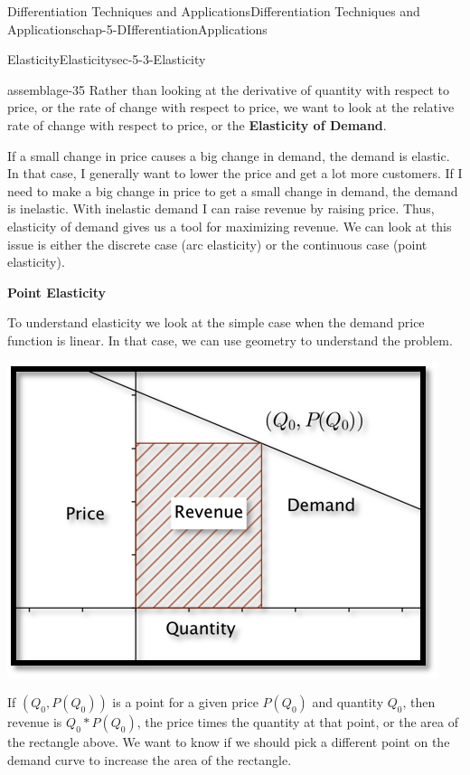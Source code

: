\documentclass[oneside,10pt,]{book}
\newcommand{\terminology}[1]{\textbf{#1}}
\numberwithin{equation}{section}
\begin{document}
\begin{chapterptx}{Differentiation Techniques and Applications}{}{Differentiation Techniques and Applications}{}{}{chap-5-DIfferentiationApplications}
\begin{sectionptx}{Elasticity}{}{Elasticity}{}{}{sec-5-3-Elasticity}
\begin{assemblage}{}{assemblage-35}%
\hypertarget{p-2021}{}%
Rather than looking at the derivative of quantity with respect to price, or the rate of change with respect to price, we want to look at the relative rate of change with respect to price, or the \terminology{Elasticity of Demand}.%
\end{assemblage}
\hypertarget{p-2022}{}%
If a small change in price causes a big change in demand, the demand is elastic.  In that case, I generally want to lower the price and get a lot more customers.  If I need to make a big change in price to get a small change in demand, the demand is inelastic.  With inelastic demand I can raise revenue by raising price.  Thus, elasticity of demand gives us a tool for maximizing revenue.  We can look at this issue is either the discrete case (arc elasticity) or the continuous case (point elasticity).%
\par
\hypertarget{p-2023}{}%
\terminology{Point Elasticity}%
\par
\hypertarget{p-2024}{}%
To understand elasticity we look at the simple case when the demand price function is linear.  In that case, we can use geometry to understand the problem.%
\begin{sidebyside}{1}{0.2}{0.2}{0}%
\begin{sbspanel}{0.6}%
\includegraphics[width=1\linewidth]{images/sec5-3-1.png}
\end{sbspanel}%
\end{sidebyside}%
\par
\hypertarget{p-2025}{}%
If \((Q_0,P(Q_0 ))\) is a point for a given price \(P(Q_0)\) and quantity \(Q_0\), then revenue is \(Q_0*P(Q_0)\), the price times the quantity at that point, or the area of the rectangle above.  We want to know if we should pick a different point on the demand curve to increase the area of the rectangle.%

\end{sectionptx}
\end{chapterptx}
\end{document}
